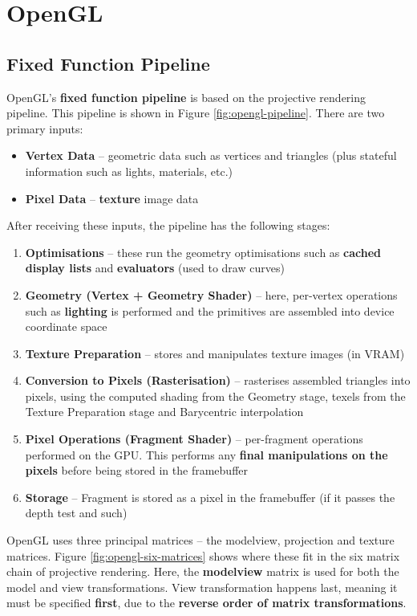 \documentclass{article}
\begin{document}
\section{OpenGL}

\subsection{Fixed Function Pipeline}
\label{sec:opengl-pipeline}

OpenGL's \textbf{fixed function pipeline} is based on the projective rendering pipeline. This pipeline is shown in Figure \ref{fig:opengl-pipeline}. There are two primary inputs:
\begin{itemize}
	\item \textbf{Vertex Data} -- geometric data such as vertices and triangles (plus stateful information such as lights, materials, etc.)
	\item \textbf{Pixel Data} -- \textbf{texture} image data
\end{itemize}

After receiving these inputs, the pipeline has the following stages:
\begin{enumerate}
	\item \textbf{Optimisations} -- these run the geometry optimisations such as \textbf{cached display lists} and \textbf{evaluators} (used to draw curves)
	\item \textbf{Geometry (Vertex + Geometry Shader)} -- here, per-vertex operations such as \textbf{lighting} is performed and the primitives are assembled into device coordinate space
	\item \textbf{Texture Preparation} -- stores and manipulates texture images (in VRAM)
	\item \textbf{Conversion to Pixels (Rasterisation)} -- rasterises assembled triangles into pixels, using the computed shading from the Geometry stage, texels from the Texture Preparation stage and Barycentric interpolation
	\item \textbf{Pixel Operations (Fragment Shader)} -- per-fragment operations performed on the GPU. This performs any \textbf{final manipulations on the pixels} before being stored in the framebuffer
	\item \textbf{Storage} -- Fragment is stored as a pixel in the framebuffer (if it passes the depth test and such)
\end{enumerate}

OpenGL uses three principal matrices -- the modelview, projection and texture matrices. Figure \ref{fig:opengl-six-matrices} shows where these fit in the six matrix chain of projective rendering. Here, the \textbf{modelview} matrix is used for both the model and view transformations. View transformation happens last, meaning it must be specified \textbf{first}, due to the \textbf{reverse order of matrix transformations}. 
\end{document}

